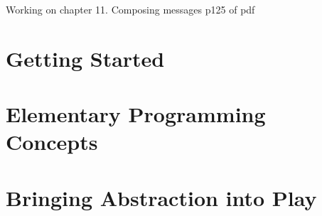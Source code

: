 \documentclass[a4paper,10pt,twoside]{book}
\begin{document}
\vfill
\pagestyle{newheadings}
\tableofcontents
\sloppy %

Working on chapter 11. Composing messages p125 of pdf

\mainmatter

\part{Getting Started}
\pagestyle{headings}












\part{Elementary Programming Concepts}











\part{Bringing Abstraction into Play}



% 
% 
% 
% 
\end{document}
